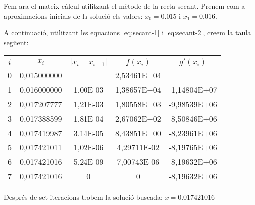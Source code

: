 \begin{exemple}
Fem ara el mateix càlcul utilitzant el mètode de la recta secant. Prenem com a  aproximacions inicials de la solució els valors: $x_0 = \num{0,015}$ i $x_1 = \num{0,016}$.

 A continuació, utilitzant les equacions \eqref{eq:secant-1} i \eqref{eq:secant-2}, creem la taula següent:

\begin{center}
   \centering
   \begin{tabular}{S[table-format=1.0]S[table-format=2.9]S[table-format=2.2e+2]
   S[table-format=2.5e+2]S[table-format=+3.5e+2]}
    & {$x_i$}  & {$|x_i - x_{i-1}|$} & {$f(x_i)$} & {$g'(x_i)$} \\
   	&  0,015000000 & {}       & 2,53461E+04 & {}             \\
       1	&  0,016000000 & 1,00E-03 & 1,38657E+04 & -1,14804E+07 \\
       2	&  0,017207777 & 1,21E-03 & 1,80558E+03 & -9,98539E+06 \\
       3	&  0,017388599 & 1,81E-04 & 2,67062E+02 & -8,50846E+06 \\
       4	&  0,017419987 & 3,14E-05 & 8,43851E+00 & -8,23961E+06 \\
       5	&  0,017421011 & 1,02E-06 & 4,29711E-02 & -8,19765E+06 \\
       6	&  0,017421016 & 5,24E-09 & 7,00743E-06 & -8,19632E+06 \\
       7	&  0,017421016 & 0        & 0           & -8,19632E+06 \\
   \bottomrule[1pt]
   \end{tabular}
\end{center}


Després de set iteracions trobem la solució buscada: $x=\num{0,017421016}$


\end{exemple} 